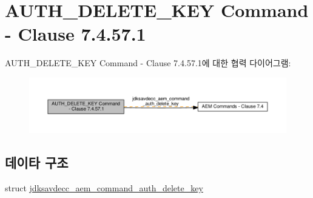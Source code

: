 \hypertarget{group__command__auth__delete__key}{}\section{A\+U\+T\+H\+\_\+\+D\+E\+L\+E\+T\+E\+\_\+\+K\+EY Command -\/ Clause 7.4.57.1}
\label{group__command__auth__delete__key}
A\+U\+T\+H\+\_\+\+D\+E\+L\+E\+T\+E\+\_\+\+K\+EY Command -\/ Clause 7.4.57.1에 대한 협력 다이어그램\+:
\nopagebreak
\begin{figure}[H]
\begin{center}
\leavevmode
\includegraphics[width=350pt]{group__command__auth__delete__key}
\end{center}
\end{figure}
\subsection*{데이타 구조}
\begin{DoxyCompactItemize}
\item 
struct \hyperlink{structjdksavdecc__aem__command__auth__delete__key}{jdksavdecc\+\_\+aem\+\_\+command\+\_\+auth\+\_\+delete\+\_\+key}
\end{DoxyCompactItemize}
